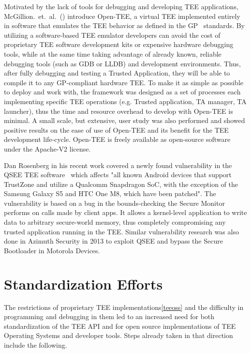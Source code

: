 \documentclass[cameraready]{cseminar}
\begin{document}
Motivated by the lack of tools for debugging and developing TEE applications, McGillion.~et.~al.~(\cite{opentee}) introduce Open-TEE, a virtual TEE implemented entirely in software that emulates the TEE behavior as defined in the GP~\cite{gpspec} standards. By utilizing a software-based TEE emulator developers can avoid the cost of proprietary TEE software development kits or expensive hardware debugging tools, while at the same time taking advantage of already known, reliable debugging tools (such as GDB or LLDB) and development environments. Thus, after fully debugging and testing a Trusted Application, they will be able to compile it to any GP-compliant hardware TEE. To make it as simple as possible to deploy and work with, the framework was designed as a set of processes each implementing specific TEE operations (e.g. Trusted application, TA manager, TA launcher), thus the time and resource overhead to develop with Open-TEE is minimal. A small scale, but extensive, user study was also performed and showed positive results on the ease of use of Open-TEE and its benefit for the TEE development life-cycle. Open-TEE is freely available as open-source software under the Apache-V2 license.

Dan Rosenberg in his recent work covered a newly found vulnerability in the QSEE TEE software~\cite{qseevulnerability} which affects "all known Android devices that support TrustZone and utilize a Qualcomm Snapdragon SoC, with the exception of the Samsung Galaxy S5 and HTC One M8, which have been patched". The vulnerability is based on a bug in the bounds-checking the Secure Monitor performs on calls made by client apps. It allows a kernel-level application to write data to arbitrary secure-world memory, thus completely compromising any trusted application running in the TEE. Similar vulnerability research was also done in Azimuth Security in 2013 to exploit QSEE and bypass the Secure Bootloader in Motorola Devices.


\section{Standardization Efforts}
\label{standardization}

The restrictions of proprietary TEE implementations\ref{teeoss} and the difficulty in programming and debugging in them led to an increased need for both standardization of the TEE API and for open source implementations of TEE Operating Systems and developer tools. Steps already taken in that direction include the following.
\end{document}
